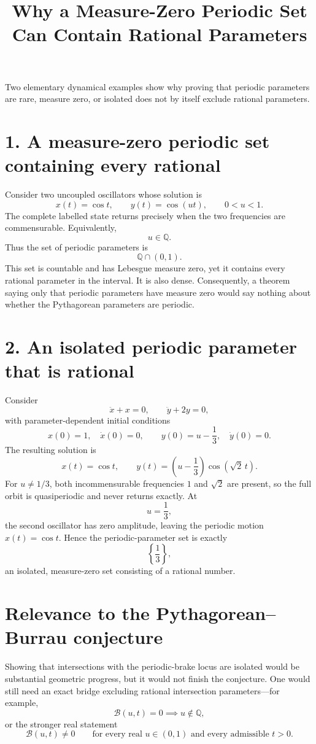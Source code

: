 \documentclass[11pt]{article}
\title{Why a Measure-Zero Periodic Set Can Contain Rational Parameters}
\author{}
\date{}
\begin{document}
\maketitle

Two elementary dynamical examples show why proving that periodic parameters are
rare, measure zero, or isolated does not by itself exclude rational parameters.

\section*{1. A measure-zero periodic set containing every rational}

Consider two uncoupled oscillators whose solution is
\[
  x(t)=\cos t,
  \qquad
  y(t)=\cos(ut),
  \qquad 0<u<1.
\]
The complete labelled state returns precisely when the two frequencies are
commensurable.  Equivalently,
\[
  u\in\mathbb{Q}.
\]
Thus the set of periodic parameters is
\[
  \mathbb{Q}\cap(0,1).
\]
This set is countable and has Lebesgue measure zero, yet it contains every
rational parameter in the interval.  It is also dense.  Consequently, a theorem
saying only that periodic parameters have measure zero would say nothing about
whether the Pythagorean parameters are periodic.

\section*{2. An isolated periodic parameter that is rational}

Consider
\[
  \ddot{x}+x=0,
  \qquad
  \ddot{y}+2y=0,
\]
with parameter-dependent initial conditions
\[
  x(0)=1,
  \quad \dot{x}(0)=0,
  \qquad
  y(0)=u-\frac13,
  \quad \dot{y}(0)=0.
\]
The resulting solution is
\[
  x(t)=\cos t,
  \qquad
  y(t)=\left(u-\frac13\right)\cos(\sqrt{2}\,t).
\]
For \(u\ne 1/3\), both incommensurable frequencies \(1\) and \(\sqrt{2}\) are
present, so the full orbit is quasiperiodic and never returns exactly.  At
\[
  u=\frac13,
\]
the second oscillator has zero amplitude, leaving the periodic motion
\(x(t)=\cos t\).  Hence the periodic-parameter set is exactly
\[
  \left\{\frac13\right\},
\]
an isolated, measure-zero set consisting of a rational number.

\section*{Relevance to the Pythagorean--Burrau conjecture}

Showing that intersections with the periodic-brake locus are isolated would be
substantial geometric progress, but it would not finish the conjecture.  One
would still need an exact bridge excluding rational intersection parameters---for
example,
\[
  \mathcal{B}(u,t)=0 \implies u\notin\mathbb{Q},
\]
or the stronger real statement
\[
  \mathcal{B}(u,t)\ne0
  \qquad
  \text{for every real }u\in(0,1)\text{ and every admissible }t>0.
\]
\end{document}
